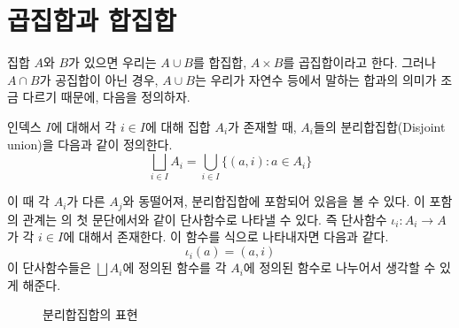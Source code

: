 \section{곱집합과 합집합}
집합 $A$와 $B$가 있으면 우리는 $A \cup B$를 합집합, $A \times B$를 곱집합이라고 한다.
그러나 $A \cap B$가 공집합이 아닌 경우, $A \cup B$는 우리가 자연수 등에서 말하는 합과의 의미가 조금 다르기 때문에, 다음을 정의하자.
\begin{definition}\label{def:disjoint}
    인덱스 $I$에 대해서 각 $i \in I$에 대해 집합 $A_i$가 존재할 때, $A_i$들의 분리합집합(Disjoint union)을 다음과 같이 정의한다.
    \begin{equation*}
        \bigsqcup_{i \in I} A_i = \bigcup_{i \in I} \{ (a, i): a \in A_i \}
    \end{equation*}
\end{definition}
이 때 각 $A_i$가 다른 $A_j$와 동떨어져, 분리합집합에 포함되어 있음을 볼 수 있다.
이 포함의 관계는 의 첫 문단에서와 같이 단사함수로 나타낼 수 있다.
즉 단사함수 $\iota_i : A_i \to A$가 각 $i \in I$에 대해서 존재한다.
이 함수를 식으로 나타내자면 다음과 같다.
\begin{equation*}
    \iota_i(a) = (a, i)
\end{equation*}
이 단사함수들은 $\bigsqcup A_i$에 정의된 함수를 각 $A_i$에 정의된 함수로 나누어서 생각할 수 있게 해준다.
\begin{figure}[ht]
    \centering
{}
    \caption{분리합집합의 표현}
    \label{fig:coproductset}
\end{figure}


